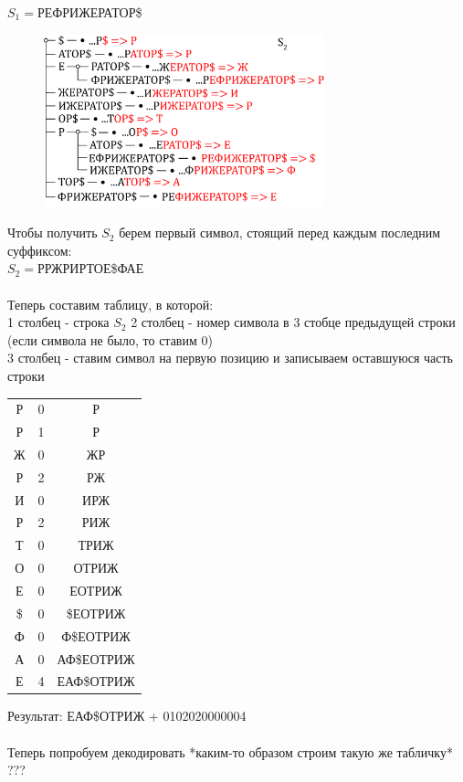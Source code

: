 \documentclass[discrete.tex]{subfiles}
\begin{document}
  \begin{example}[по Григорьевой]
    $S_1=$РЕФРИЖЕРАТОР\$
    \begin{figure}[H]
        \includegraphics[height=5cm]{pics/27_1.png}
        \centering
    \end{figure}
    Чтобы получить $S_2$ берем первый символ, стоящий перед каждым последним суффиксом:\\
    $S_2=$РРЖРИРТОЕ\$ФАЕ\\ \ \\
    Теперь составим таблицу, в которой:\\
    1 столбец - строка $S_2$
    2 столбец - номер символа в 3 стобце предыдущей строки (если символа не было, то ставим 0)\\
    3 столбец - ставим символ на первую позицию и записываем оставшуюся часть строки\\
    \begin{tabular}{c|c|c}
      Р & 0 & Р\\
      Р & 1 & Р\\
      Ж & 0 & ЖР\\
      Р & 2 & РЖ\\
      И & 0 & ИРЖ\\
      Р & 2 & РИЖ\\
      Т & 0 & ТРИЖ\\
      О & 0 & ОТРИЖ\\
      Е & 0 & ЕОТРИЖ\\
      \$& 0 & \$ЕОТРИЖ\\
      Ф & 0 & Ф\$ЕОТРИЖ\\
      А & 0 & АФ\$ЕОТРИЖ\\
      Е & 4 & ЕАФ\$ОТРИЖ
    \end{tabular}
    Результат: ЕАФ\$ОТРИЖ + 0102020000004\\ \ \\
    Теперь попробуем декодировать *каким-то образом строим такую же табличку*\\
    ???
  \end{example}
\end{document}
